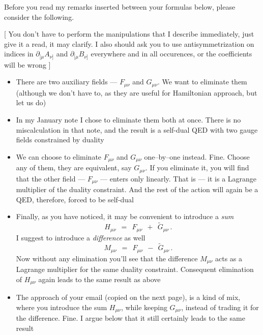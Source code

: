 \documentclass[epsfig,12pt]{article}
\begin{document}
	Before you read my remarks inserted between your formulas below, please consider the following.
	
	[
	You don't have to perform the manipulations that I describe immediately, 
	just give it a read, it may clarify.
	I also should ask you to use antisymmetrization on indices in $ \partial_{[\mu} A_{\nu]} $
	and $ \partial_{[\mu} B_{\nu]} $ everywhere and in all occurences, or the coefficients will be wrong 
	]

\begin{itemize}
\item
	There are two auxiliary fields --- $ F_{\mu\nu} $ and $ G_{\mu\nu} $. 
	We want to eliminate them 
	(although we don't have to, as they are useful for Hamiltonian approach, but let us do)

\item
	In my January note I chose to eliminate them both at once. 
	There is no miscalculation in that note, and the result is 
	a self-dual QED with two gauge fields constrained by duality

\item
	We can choose to eliminate $ F_{\mu\nu} $ and $ G_{\mu\nu} $ one--by--one instead. 
	Fine. Choose any of them, they are equivalent, say $ G_{\mu\nu} $. 
	If you eliminate it, you will find that the other field --- $ F_{\mu\nu} $ ---
	enters only linearly. 
	That is  --- it is a Lagrange multiplier of the duality constraint.
	And the rest of the action will again be a QED, therefore, forced to be self-dual

\item
	Finally, as you have noticed, it may be convenient to introduce a {\it sum}
\[
	H_{\mu\nu}  ~~=~~  F_{\mu\nu}  ~~+~~  \widetilde{G}_{\mu\nu}\,.
\]
	I suggest to introduce a {\it difference} as well
\[
	M_{\mu\nu}  ~~=~~  F_{\mu\nu}  ~~-~~  \widetilde{G}_{\mu\nu}\,.
\]
	Now without any elimination you'll see that the difference $ M_{\mu\nu} $ acts
	as a Lagrange multiplier for the same duality constraint.
	Consequent elimination of $ H_{\mu\nu} $ again leads to the same result as above

\item
	The approach of your email (copied on the next page), is a kind of mix,
	where you introduce the sum $ H_{\mu\nu} $, while keeping $ G_{\mu\nu} $,
	instead of trading it for the difference. Fine.
	I argue below that it still certainly leads to the same result

\end{itemize}
\end{document}
